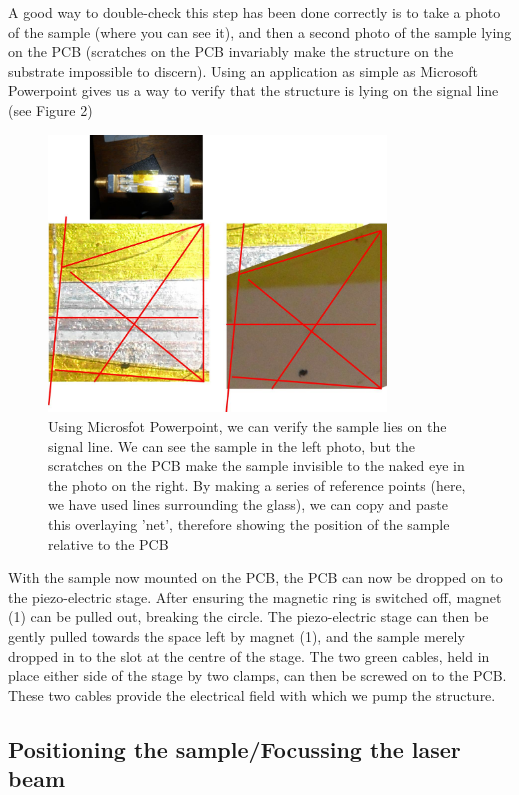 \documentclass[14pt,a4paper] {article}
\begin{document}
A good way to double-check this step has been done correctly is to take a photo of the sample (where you can see it), and then a second photo of the sample lying on the PCB (scratches on the PCB invariably make the structure on the substrate impossible to discern). Using an application as simple as Microsoft Powerpoint gives us a way to verify that the structure is lying on the signal line (see Figure 2) 

\begin{figure}
\includegraphics[width=0.8\textwidth]{PCB-Signal-line-Sample-Verification.jpg}

\caption{Using Microsfot Powerpoint, we can verify the sample lies on the signal line. We can see the sample in the left photo, but the scratches on the PCB make the sample invisible to the naked eye in the photo on the right. By making a series of reference points (here, we have used lines surrounding the glass), we can copy and paste this overlaying 'net', therefore showing the position of the sample relative to the PCB}
\label{overflow}
\end{figure}


With the sample now mounted on the PCB, the PCB can now be dropped on to the piezo-electric stage. After ensuring the magnetic ring is switched off, magnet (1) can be pulled out, breaking the circle. The piezo-electric stage can then be gently pulled towards the space left by magnet (1), and the sample merely dropped in to the slot at the centre of the stage. The two green cables, held in place either side of the stage by two clamps, can then be screwed on to the PCB. These two cables provide the electrical field with which we pump the structure.


\subsection{Positioning the sample/Focussing the laser beam}
\end{document}
